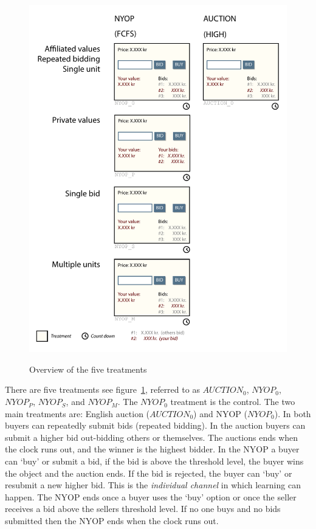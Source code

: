 \documentclass[a4paper,12pt]{article}
\begin{document}
	\begin{figure}
	        \centering
	        \caption{Overview of the five treatments}
	        \includegraphics[width=\textwidth]{Figures/Treatments}
			\label{fig:treatments}
	\end{figure}

	There are five treatments see figure~\ref{fig:treatments}, referred to as $AUCTION_0$, $NYOP_0$, $NYOP_P$, $NYOP_S$, and $NYOP_M$. The $NYOP_0$ treatment is the control. The two main treatments are: English auction ($AUCTION_0$) and NYOP ($NYOP_0$).
	In both buyers can repeatedly submit bids (repeated bidding). In the auction buyers can submit a higher bid out-bidding others or themselves. The auctions ends when the clock runs out, and the winner is the highest bidder. In the NYOP a buyer can `buy' or submit a bid, if the bid is above the threshold level, the buyer wins the object and the auction ends. If the bid is rejected, the buyer can `buy' or resubmit a new higher bid. This is the \emph{individual channel} in which learning can happen. The NYOP ends once a buyer uses the `buy' option or once the seller receives a bid above the sellers threshold level. If no one buys and no bids submitted then the NYOP ends when the clock runs out.
\end{document}
